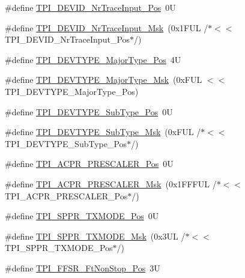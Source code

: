 \begin{DoxyCompactItemize}
\item 
\#define \hyperlink{group___c_m_s_i_s___t_p_i_ga80ecae7fec479e80e583f545996868ed}{T\+P\+I\+\_\+\+D\+E\+V\+I\+D\+\_\+\+Nr\+Trace\+Input\+\_\+\+Pos}~0U
\item 
\#define \hyperlink{group___c_m_s_i_s___t_p_i_gabed454418d2140043cd65ec899abd97f}{T\+P\+I\+\_\+\+D\+E\+V\+I\+D\+\_\+\+Nr\+Trace\+Input\+\_\+\+Msk}~(0x1\+F\+U\+L /$\ast$$<$$<$ T\+P\+I\+\_\+\+D\+E\+V\+I\+D\+\_\+\+Nr\+Trace\+Input\+\_\+\+Pos$\ast$/)
\item 
\#define \hyperlink{group___c_m_s_i_s___t_p_i_ga69c4892d332755a9f64c1680497cebdd}{T\+P\+I\+\_\+\+D\+E\+V\+T\+Y\+P\+E\+\_\+\+Major\+Type\+\_\+\+Pos}~4U
\item 
\#define \hyperlink{group___c_m_s_i_s___t_p_i_gaecbceed6d08ec586403b37ad47b38c88}{T\+P\+I\+\_\+\+D\+E\+V\+T\+Y\+P\+E\+\_\+\+Major\+Type\+\_\+\+Msk}~(0x\+F\+U\+L $<$$<$ T\+P\+I\+\_\+\+D\+E\+V\+T\+Y\+P\+E\+\_\+\+Major\+Type\+\_\+\+Pos)
\item 
\#define \hyperlink{group___c_m_s_i_s___t_p_i_ga0c799ff892af5eb3162d152abc00af7a}{T\+P\+I\+\_\+\+D\+E\+V\+T\+Y\+P\+E\+\_\+\+Sub\+Type\+\_\+\+Pos}~0U
\item 
\#define \hyperlink{group___c_m_s_i_s___t_p_i_ga5b2fd7dddaf5f64855d9c0696acd65c1}{T\+P\+I\+\_\+\+D\+E\+V\+T\+Y\+P\+E\+\_\+\+Sub\+Type\+\_\+\+Msk}~(0x\+F\+U\+L /$\ast$$<$$<$ T\+P\+I\+\_\+\+D\+E\+V\+T\+Y\+P\+E\+\_\+\+Sub\+Type\+\_\+\+Pos$\ast$/)
\item 
\#define \hyperlink{group___c_m_s_i_s___t_p_i_ga5a82d274eb2df8b0c92dd4ed63535928}{T\+P\+I\+\_\+\+A\+C\+P\+R\+\_\+\+P\+R\+E\+S\+C\+A\+L\+E\+R\+\_\+\+Pos}~0U
\item 
\#define \hyperlink{group___c_m_s_i_s___t_p_i_ga4fcacd27208419929921aec8457a8c13}{T\+P\+I\+\_\+\+A\+C\+P\+R\+\_\+\+P\+R\+E\+S\+C\+A\+L\+E\+R\+\_\+\+Msk}~(0x1\+F\+F\+F\+U\+L /$\ast$$<$$<$ T\+P\+I\+\_\+\+A\+C\+P\+R\+\_\+\+P\+R\+E\+S\+C\+A\+L\+E\+R\+\_\+\+Pos$\ast$/)
\item 
\#define \hyperlink{group___c_m_s_i_s___t_p_i_ga0f302797b94bb2da24052082ab630858}{T\+P\+I\+\_\+\+S\+P\+P\+R\+\_\+\+T\+X\+M\+O\+D\+E\+\_\+\+Pos}~0U
\item 
\#define \hyperlink{group___c_m_s_i_s___t_p_i_gaca085c8a954393d70dbd7240bb02cc1f}{T\+P\+I\+\_\+\+S\+P\+P\+R\+\_\+\+T\+X\+M\+O\+D\+E\+\_\+\+Msk}~(0x3\+U\+L /$\ast$$<$$<$ T\+P\+I\+\_\+\+S\+P\+P\+R\+\_\+\+T\+X\+M\+O\+D\+E\+\_\+\+Pos$\ast$/)
\item 
\#define \hyperlink{group___c_m_s_i_s___t_p_i_ga9537b8a660cc8803f57cbbee320b2fc8}{T\+P\+I\+\_\+\+F\+F\+S\+R\+\_\+\+Ft\+Non\+Stop\+\_\+\+Pos}~3U
$$
\end{DoxyCompactItemize}
